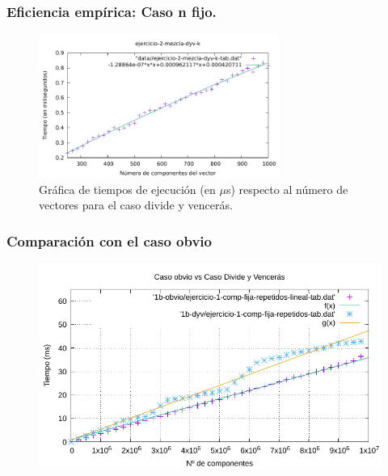 \documentclass[13pt]{beamer}
\begin{document}
    \begin{frame}
        \frametitle{Eficiencia empírica: Caso n fijo.}

        \begin{figure}
            \includegraphics[width=0.7\textwidth]{../data/2-dyv/ejercicio-2-mezcla-dyv-k-graph.pdf}
            \caption{Gráfica de tiempos de ejecución (en $\mu$s) respecto al número de vectores para el caso divide y vencerás.}
        \end{figure}
    \end{frame}

    \begin{frame}
        \frametitle{Comparación con el caso obvio}

        \begin{figure}
            \centering
            \includegraphics[scale=0.66]{img/e1b-comp.pdf}
            \label{fig:1b-comp}
        \end{figure}

    \end{frame}

\end{document}
